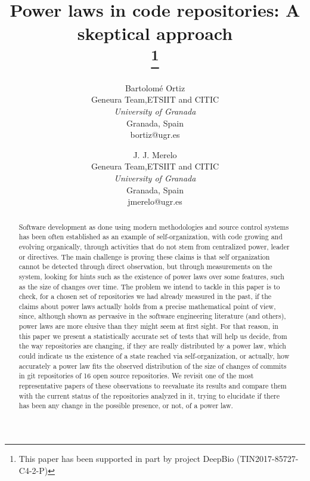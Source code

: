 \documentclass{article}
\begin{document}
\title{Power laws in code repositories: A skeptical approach\\
  \thanks{This paper has been supported in part by project DeepBio
    (TIN2017-85727-C4-2-P)} }

\author{ Bartolom\'{e} Ortiz\\
  Geneura Team,ETSIIT and CITIC \\
    \textit{University of Granada}\\
    Granada, Spain \\
    bortiz@ugr.es
  \and
  J. J. Merelo\\
  Geneura Team,ETSIIT and CITIC \\
    \textit{University of Granada}\\
    Granada, Spain \\
    jmerelo@ugr.es}

\maketitle

\begin{abstract}
  
  Software development as done using modern methodologies and source
  control systems has been often established as an example of
  self-organization, with code growing and evolving organically,
  through activities that do not stem from centralized power, leader
  or directives.  The main challenge is proving these claims is that
  self organization cannot be detected through direct observation, but
  through measurements on the system, looking for hints such as the
  existence of power laws over some features, such as the size of
  changes over time.  The problem we intend to tackle in this paper is
  to check, for a chosen set of repositories we had already measured
  in the past, if the claims about power laws actually holds from a
  precise mathematical point of view, since, although shown as
  pervasive in the software engineering literature (and others), power
  laws are more elusive than they might seem at first sight. For that
  reason, in this paper we present a statistically accurate set of
  tests that will help us decide, from the way repositories are
  changing, if they are really distributed by a power law, which could
  indicate us the existence of a state reached via self-organization,
  or actually, how accurately a power law fits the observed
  distribution of the size of changes of commits in git repositories
  of 16 open source repositories.  We revisit one of the most
  representative papers of these observations to reevaluate its
  results and compare them with the current status of the repositories
  analyzed in it, trying to elucidate if there has been any change in
  the possible presence, or not, of a power law.

\end{abstract}
\end{document}
